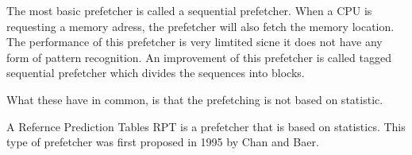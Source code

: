 The most basic prefetcher is called a sequential prefetcher. When a CPU is requesting a memory adress, the prefetcher will also fetch the memory location. The performance of this prefetcher is very limtited sicne it does not have any form of pattern recognition. An improvement of this prefetcher is called tagged sequential prefetcher which divides the sequences into blocks.

What these have in common, is that the prefetching is not based on statistic.  

A Refernce Prediction Tables RPT is a prefetcher that is based on statistics. This type of prefetcher was first proposed in 1995 by Chan and Baer.
